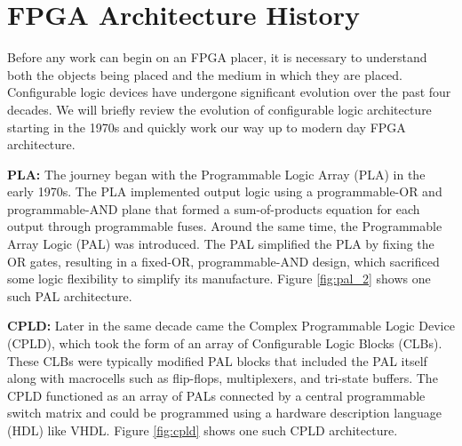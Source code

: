 \section{FPGA Architecture History}
Before any work can begin on an FPGA placer, it is necessary to understand both the objects being placed and the medium in which they are placed.
Configurable logic devices have undergone significant evolution over the past four decades. 
We will briefly review the evolution of configurable logic architecture starting in the 1970s and quickly work our way up to modern day FPGA architecture. 

\textbf{PLA:} \quad
The journey began with the Programmable Logic Array (PLA) in the early 1970s. 
The PLA implemented output logic using a programmable-OR and programmable-AND plane that formed a sum-of-products equation for each output through programmable fuses. 
Around the same time, the Programmable Array Logic (PAL) was introduced. 
The PAL simplified the PLA by fixing the OR gates, resulting in a fixed-OR, programmable-AND design, which sacrificed some logic flexibility to simplify its manufacture. 
Figure \ref{fig:pal_2} shows one such PAL architecture. 

\textbf{CPLD:} \quad 
Later in the same decade came the Complex Programmable Logic Device (CPLD), which took the form of an array of Configurable Logic Blocks (CLBs). 
These CLBs were typically modified PAL blocks that included the PAL itself along with macrocells such as flip-flops, multiplexers, and tri-state buffers. 
The CPLD functioned as an array of PALs connected by a central programmable switch matrix and could be programmed using a hardware description language (HDL) like VHDL. 
Figure \ref{fig:cpld} shows one such CPLD architecture. 
\\

